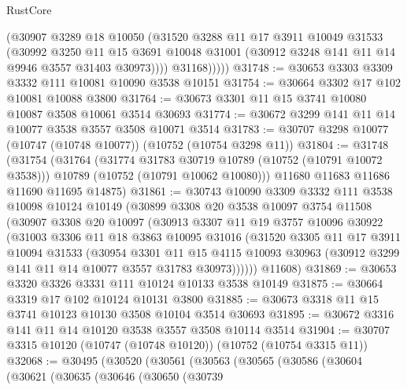 \begin{lexlean}{RustCore}
\begin{coremodule}
              (@30907
                @3289
                @18
                @10050
                (@31520
                  @3288
                  @11
                  @17
                  @3911
                  @10049
                  @31533
                  (@30992
                    @3250
                    @11
                    @15
                    @3691
                    @10048
                    @31001
                    (@30912 @3248 @141 @11 @14 @9946 @3557 @31403 @30973))))
              @31168)))))
@31748 := @30653 @3303 @3309 @3332 @111 @10081 @10090 @3538 @10151
@31754 := @30664 @3302 @17 @102 @10081 @10088 @3800
@31764 := @30673 @3301 @11 @15 @3741 @10080 @10087 @3508 @10061 @3514 @30693
@31774 := @30672 @3299 @141 @11 @14 @10077 @3538 @3557 @3508 @10071 @3514
@31783 := @30707 @3298 @10077 (@10747 (@10748 @10077)) (@10752 (@10754 @3298 @11))
@31804 := @31748
    (@31754
      (@31764
        (@31774 @31783 @30719 @10789 (@10752 (@10791 @10072 @3538)))
        @10789
        (@10752 (@10791 @10062 @10080)))
      @11680
      @11683
      @11686
      @11690
      @11695
      @14875)
@31861 := @30743
    @10090
    @3309
    @3332
    @111
    @3538
    @10098
    @10124
    @10149
    (@30899
      @3308
      @20
      @3538
      @10097
      @3754
      @11508
      (@30907
        @3308
        @20
        @10097
        (@30913
          @3307
          @11
          @19
          @3757
          @10096
          @30922
          (@31003
            @3306
            @11
            @18
            @3863
            @10095
            @31016
            (@31520
              @3305
              @11
              @17
              @3911
              @10094
              @31533
              (@30954
                @3301
                @11
                @15
                @4115
                @10093
                @30963
                (@30912 @3299 @141 @11 @14 @10077 @3557 @31783 @30973))))))
      @11608)
@31869 := @30653 @3320 @3326 @3331 @111 @10124 @10133 @3538 @10149
@31875 := @30664 @3319 @17 @102 @10124 @10131 @3800
@31885 := @30673 @3318 @11 @15 @3741 @10123 @10130 @3508 @10104 @3514 @30693
@31895 := @30672 @3316 @141 @11 @14 @10120 @3538 @3557 @3508 @10114 @3514
@31904 := @30707 @3315 @10120 (@10747 (@10748 @10120)) (@10752 (@10754 @3315 @11))
@32068 := @30495
    (@30520
      (@30561
        (@30563
          (@30565
            (@30586
              (@30604
                (@30621
                  (@30635
                    (@30646
                      (@30650
                        (@30739

\end{coremodule}
\end{lexlean}
